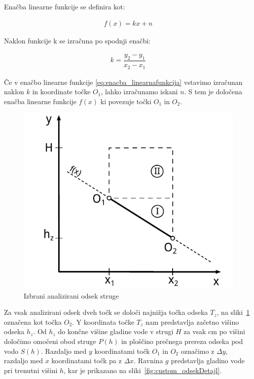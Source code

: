 Enačba linearne funkcije se definira kot:
\begin{ceqn}
\begin{align}
f(x) = kx + n \label{eq:enacba_linearnafunkcija}
\end{align}
\end{ceqn}

Naklon funkcije k se izračuna po spodnji enačbi:

\begin{ceqn}
\begin{align}
k = \dfrac{y_2 - y_1}{x_2 - x_1}
\end{align}
\end{ceqn}



Če v enačbo linearne funkcije \ref{eq:enacba_linearnafunkcija} vstavimo izračunan naklon $k$ in koordinate točke $O_1$, lahko izračunamo iskani $n$. S tem je določena enačba linearne funkcije $f(x)$ ki povezuje točki $O_1$ in $O_2$.

\begin{figure}[H]
	\begin{centering}
		\includegraphics{slike/customChannel/odsek.pdf}
		\caption{Izbrani analizirani odsek struge} \label{fig:odsekStruge}
	\end{centering}
\end{figure}








Za vsak analizirani odsek dveh točk se določi najnižja točka odseka $T_z$, na sliki~\ref{fig:odsekStruge} označena kot točka $O_2$. Y koordinata točke $T_z$ nam predstavlja začetno višino odseka $h_{z}$. Od $h_z$ do končne višine gladine vode v strugi $H$ za vsak cm po višini določimo omočeni obod struge $P(h)$ in ploščino prečnega prereza odseka pod vodo $S(h)$. Razdaljo med $y$ koordinatami točk $O_1$ in $O_2$ označimo z $\Delta y$, razdaljo med $x$ koordinatami točk pa z $\Delta x$.  Ravnina $g$ predstavlja gladino vode pri trenutni višini $h$, kar je prikazano na sliki~\ref{fig:custom_odsekDetajl}.


